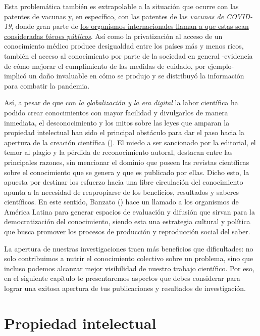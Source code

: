 \documentclass[
  spanish,
  a4paper,
  oneside]{scrbook}
\begin{document}
Esta problemática también es extrapolable a la situación que ocurre con
las patentes de vacunas y, en específico, con las patentes de las
\emph{vacunas de COVID-19}, donde gran parte de
\href{https://en.unesco.org/news/unesco-calls-covid-19-vaccines-be-considered-global-public-good}{los
organismos internacionales llaman a que estas sean consideradas
\emph{bienes públicos}}. Así como la privatización al acceso de un
conocimiento médico produce desigualdad entre los países más y menos
ricos, también el acceso al conocimiento por parte de la sociedad en
general -evidencia de cómo mejorar el cumplimiento de las medidas de
cuidado, por ejemplo- implicó un daño invaluable en cómo se produjo y se
distribuyó la información para combatir la pandemia.

Así, a pesar de que con \emph{la globalización y la era digital} la
labor científica ha podido crear conocimientos con mayor facilidad y
divulgarlos de manera inmediata, el desconocimiento y los mitos sobre
las leyes que amparan la propiedad intelectual han sido el principal
obstáculo para dar el paso hacia la apertura de la creación científica
(). El miedo a ser sancionado por la editorial, el temor al plagio y
la pérdida de reconocimiento autoral, destacan entre las principales
razones, sin mencionar el dominio que poseen las revistas científicas
sobre el conocimiento que se genera y que es publicado por ellas. Dicho
esto, la apuesta por destinar los esfuerzo hacia una libre circulación
del conocimiento apunta a la necesidad de reapropiarse de los
beneficios, resultados y saberes científicos. En este sentido, Banzato
() hace un llamado a los
organismos de América Latina para generar espacios de evaluación y
difusión que sirvan para la democratización del conocimiento, siendo
esta una estrategia cultural y política que busca promover los procesos
de producción y reproducción social del saber.

La apertura de nuestras investigaciones traen más beneficios que
dificultades: no solo contribuimos a nutrir el conocimiento colectivo
sobre un problema, sino que incluso podemos alcanzar mejor visibilidad
de nuestro trabajo científico. Por eso, en el siguiente capítulo te
presentaremos aspectos que debes considerar para lograr una exitosa
apertura de tus publicaciones y resultados de investigación.

\chapter{Propiedad intelectual}\label{propiedad}
\end{document}
